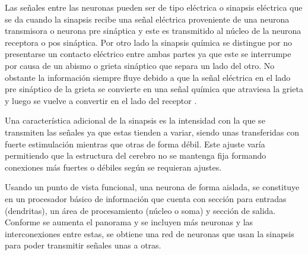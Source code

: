 		Las se\~{n}ales entre las neuronas pueden ser de tipo el\'{e}ctrica o sinapsis
	el\'{e}ctrica que se da cuando la sinapsis recibe una se\~{n}al el\'{e}ctrica proveniente
	de una neurona transmisora o neurona pre sin\'{a}ptica y este es transmitido al
	n\'{u}cleo de la neurona receptora o pos sin\'{a}ptica. Por otro lado la
	sinapsis qu\'{i}mica se distingue por no presentarse un contacto el\'{e}ctrico
	entre ambas partes ya que este se interrumpe por causa de un abismo o grieta
	sin\'{a}ptico que separa un lado del otro. No obstante la informaci\'{o}n
	siempre fluye debido a que la se\~{n}al el\'{e}ctrica en el lado pre
	sin\'{a}ptico de la grieta se convierte en una se\~{n}al qu\'{i}mica que
	atraviesa la grieta y luego se vuelve a convertir en el lado del receptor
	\cite{Kriesel2005}.
 	
 		Una caracter\'{i}stica adicional de la sinapsis es la intensidad con la que se
 	transmiten las se\~{n}ales ya que estas tienden a variar, siendo unas transferidas
 	con fuerte estimulaci\'{o}n mientras que otras de forma d\'{e}bil. Este ajuste
 	var\'{i}a permitiendo que la estructura del cerebro no se mantenga fija
 	formando conexiones m\'{a}s fuertes o d\'{e}biles seg\'{u}n se requieran ajustes.

 		Usando un punto de vista funcional, una neurona de forma aislada, se
 	constituye en un procesador b\'{a}sico de informaci\'{o}n que cuenta con secci\'{o}n para
 	entradas (dendritas), un \'{a}rea de procesamiento (n\'{u}cleo o soma) y secci\'{o}n de
 	salida. Conforme se aumenta el panorama y se incluyen m\'{a}s neuronas y las interconexiones entre estas, se obtiene una red de neuronas que usan la sinapsis para poder transmitir se\~{n}ales unas a otras.
 		
 		
